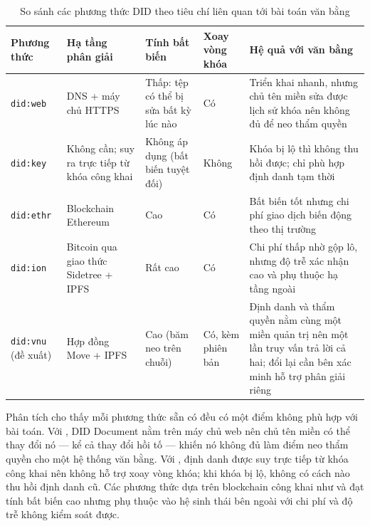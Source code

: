 \begin{table}[H]
\centering
\caption{So sánh các phương thức DID theo tiêu chí liên quan tới bài toán văn bằng}
\label{tab:did-method-comparison}
\renewcommand{\arraystretch}{1.3}
\begin{tabular}{|p{2.1cm}|p{2.8cm}|p{2.3cm}|p{2.2cm}|p{3.6cm}|}
\hline
\textbf{Phương thức} & \textbf{Hạ tầng phân giải} & \textbf{Tính bất biến} & \textbf{Xoay vòng khóa} & \textbf{Hệ quả với văn bằng} \\ \hline

\texttt{did:web}
& DNS + máy chủ HTTPS
& Thấp: tệp có thể bị sửa bất kỳ lúc nào
& Có
& Triển khai nhanh, nhưng chủ tên miền sửa được lịch sử khóa nên không đủ để neo thẩm quyền \\ \hline

\texttt{did:key}
& Không cần; suy ra trực tiếp từ khóa công khai
& Không áp dụng (bất biến tuyệt đối)
& Không
& Khóa bị lộ thì không thu hồi được; chỉ phù hợp định danh tạm thời \\ \hline

\texttt{did:ethr}
& Blockchain Ethereum
& Cao
& Có
& Bất biến tốt nhưng chi phí giao dịch biến động theo thị trường \\ \hline

\texttt{did:ion}
& Bitcoin qua giao thức Sidetree + IPFS
& Rất cao
& Có
& Chi phí thấp nhờ gộp lô, nhưng độ trễ xác nhận cao và phụ thuộc hạ tầng ngoài \\ \hline

\texttt{did:vnu} (đề xuất)
& Hợp đồng Move + IPFS
& Cao (băm neo trên chuỗi)
& Có, kèm phiên bản
& Định danh và thẩm quyền nằm cùng một miền quản trị nên một lần truy vấn trả lời cả hai; đổi lại cần bên xác minh hỗ trợ phân giải riêng \\ \hline
\end{tabular}
\end{table}

Phân tích cho thấy mỗi phương thức sẵn có đều có một điểm không phù hợp với bài toán. Với  \cite{DIDWeb2023}, DID Document nằm trên máy chủ web nên chủ tên miền có thể thay đổi nó --- kể cả thay đổi hồi tố --- khiến nó không đủ làm điểm neo thẩm quyền cho một hệ thống văn bằng. Với  \cite{DIDKey2022}, định danh được suy trực tiếp từ khóa công khai nên không hỗ trợ xoay vòng khóa; khi khóa bị lộ, không có cách nào thu hồi định danh cũ. Các phương thức dựa trên blockchain công khai như  \cite{DIDEthr2023} và  \cite{DIDION2021} đạt tính bất biến cao nhưng phụ thuộc vào hệ sinh thái bên ngoài với chi phí và độ trễ không kiểm soát được.

